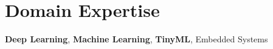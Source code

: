 
\section{Domain Expertise}
    \begin{onecolentry}
        \textbf{Deep Learning},
        \textbf{Machine Learning},
        \textbf{TinyML},
        Embedded Systems
    \end{onecolentry}

